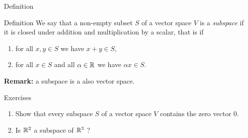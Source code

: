 \documentclass{beamer}
\begin{document}
\begin{frame}[t]{Definition}
	\begin{block}{Definition}
		We say that a non-empty subset $S$ of a vector space $V$ is a \emph{subspace} if it is closed under addition and multiplication by a scalar, that is if
		\begin{enumerate}
			\item for all $x,y \in S$ we have $x + y \in S$,
			\item for all $x \in S$ and all $\alpha \in \mathbb{R}$ we have $\alpha x \in S$.
		\end{enumerate}
	\end{block}
	\vspace{4cm}
	\textbf{Remark:} a subspace is a also vector space.
\end{frame}

\begin{frame}[t]{Exercises}
	\vspace{-0.5cm}
	\begin{exampleblock}{}
		\begin{enumerate}
			\item Show that every subspace $S$ of a vector space $V$ contains the zero vector $0$.
			\item Is $\mathbb{R}^2$ a subspace of $\mathbb{R}^3$ ?
		\end{enumerate}
	\end{exampleblock}
	\pause
	\pause
\end{frame}


\end{document}
